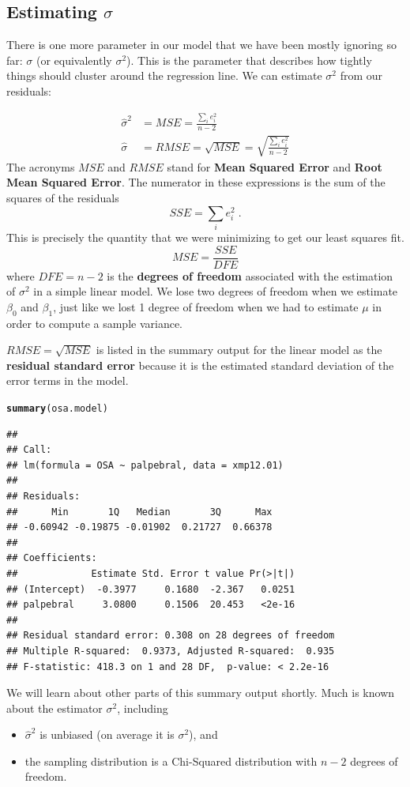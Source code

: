 \documentclass[twoside]{book}\usepackage[]{graphicx}\usepackage[]{xcolor}
\makeatletter
\newcommand{\hlstd}[1]{\textcolor[rgb]{0.345,0.345,0.345}{#1}}%
\newcommand{\hlkwd}[1]{\textcolor[rgb]{0.737,0.353,0.396}{\textbf{#1}}}%
\newenvironment{kframe}{%
 \def\at@end@of@kframe{}%
 \ifinner\ifhmode%
  \def\at@end@of@kframe{\end{minipage}}%
  \begin{minipage}{\columnwidth}%
 \fi\fi%
 \def\FrameCommand##1{\hskip\@totalleftmargin \hskip-\fboxsep
 \colorbox{shadecolor}{##1}\hskip-\fboxsep
     \hskip-\linewidth \hskip-\@totalleftmargin \hskip\columnwidth}%
 \MakeFramed {\advance\hsize-\width
   \@totalleftmargin\z@ \linewidth\hsize
   \@setminipage}}%
 {\par\unskip\endMakeFramed%
 \at@end@of@kframe}
\newenvironment{knitrout}{}{} %
\def\term#1{\textbf{#1}}
\makeatother
\begin{document}
\subsection{Estimating $\sigma$}

There is one more parameter in our model that we have been mostly ignoring so far: $\sigma$ (or 
equivalently $\sigma^2$).  This is the parameter that describes how tightly things should 
cluster around the regression line.  We can estimate $\sigma^2$ from our residuals:

\begin{align*}
\hat\sigma^2 & = MSE = \frac{ \sum_i e_i^2 }{ n -2 }
\\
\hat\sigma & = RMSE = \sqrt{MSE} = \sqrt{\frac{ \sum_i e_i^2 }{ n -2 } }
\end{align*}
The acronyms $MSE$ and $RMSE$ stand for \term{Mean Squared Error} and 
\term{Root Mean Squared Error}.
The numerator in these expressions is the sum of the squares of the residuals
\[
SSE = \sum_i e_i^2 \;.
\]
This is precisely the quantity that we were minimizing to get our least squares fit.
\[
MSE = \frac{SSE}{DFE} 
\]
where $DFE = n-2$ is the \term{degrees of freedom} associated with the
estimation of $\sigma^2$ in a simple linear model.  We lose two degrees of
freedom when we estimate $\beta_0$ and $\beta_1$, just like we lost 1 degree of
freedom when we had to estimate $\mu$ in order to compute a sample variance.

$RMSE = \sqrt{MSE}$ is listed in the summary output for the linear model as the
\term{residual standard error} because it is the estimated standard deviation of 
the error terms in the model.
\begin{knitrout}
\color{fgcolor}\begin{kframe}
\begin{alltt}
\hlkwd{summary}\hlstd{(osa.model)}
\end{alltt}
\begin{verbatim}
## 
## Call:
## lm(formula = OSA ~ palpebral, data = xmp12.01)
## 
## Residuals:
##      Min       1Q   Median       3Q      Max 
## -0.60942 -0.19875 -0.01902  0.21727  0.66378 
## 
## Coefficients:
##             Estimate Std. Error t value Pr(>|t|)
## (Intercept)  -0.3977     0.1680  -2.367   0.0251
## palpebral     3.0800     0.1506  20.453   <2e-16
## 
## Residual standard error: 0.308 on 28 degrees of freedom
## Multiple R-squared:  0.9373,	Adjusted R-squared:  0.935 
## F-statistic: 418.3 on 1 and 28 DF,  p-value: < 2.2e-16
\end{verbatim}
\end{kframe}
\end{knitrout}
We will learn about other parts of this summary output shortly.
Much is known about the estimator $\sigma^2$, including 
\begin{itemize}
	\item $\hat \sigma^2$ is unbiased (on average it is $\sigma^2$), and 
	\item
		the sampling distribution is a Chi-Squared distribution with
		$n-2$ degrees of freedom.  
	\end{itemize}
\end{document}
